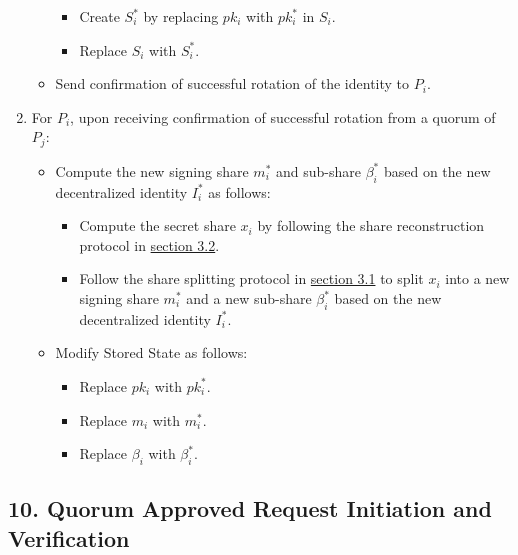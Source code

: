 \documentclass[
]{article}
\providecommand{\tightlist}{%
  \setlength{\itemsep}{0pt}\setlength{\parskip}{0pt}}
\begin{document}
\begin{enumerate}
\begin{itemize}
    \begin{itemize}
    \tightlist
    \item
      Create \(S_i^ \ast\) by replacing \(pk_i\) with \(pk_i^ \ast\) in
      \(S_i\).
    \item
      Replace \(S_i\) with \(S_i^ \ast\).
    \end{itemize}
  \item
    Send confirmation of successful rotation of the identity to \(P_i\).
  \end{itemize}
\item
  For \(P_i\), upon receiving confirmation of successful rotation from a
  quorum of \(P_j\):

  \begin{itemize}
  \tightlist
  \item
    Compute the new signing share \(m_i^ \ast\) and sub-share
    \(\beta _i^ \ast\) based on the new decentralized identity
    \(I_i^ \ast\) as follows:

    \begin{itemize}
    \tightlist
    \item
      Compute the secret share \(x_i\) by following the share
      reconstruction protocol in
      \protect\hyperlink{share-reconstruction}{section 3.2}.
    \item
      Follow the share splitting protocol in
      \protect\hyperlink{share-splitting}{section 3.1} to split \(x_i\)
      into a new signing share \(m_i^ \ast\) and a new sub-share
      \(\beta _i^ \ast\) based on the new decentralized identity
      \(I_i^ \ast\).
    \end{itemize}
  \item
    Modify Stored State as follows:

    \begin{itemize}
    \tightlist
    \item
      Replace \(pk_i\) with \(pk_i^ \ast\).
    \item
      Replace \(m_i\) with \(m_i^ \ast\).
    \item
      Replace \(\beta _i\) with \(\beta _i^ \ast\).
    \end{itemize}
  \end{itemize}
\end{enumerate}

\hypertarget{quorum-approved-request}{%
\subsection{10. Quorum Approved Request Initiation and
Verification}\label{quorum-approved-request}}
\end{document}
